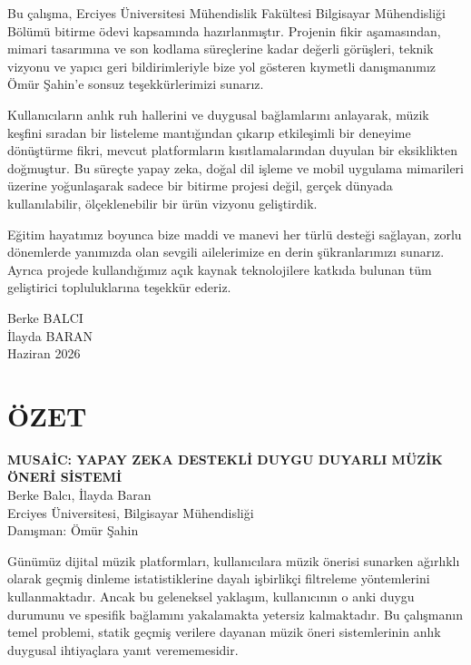 \documentclass[12pt, a4paper]{report}
\begin{document}
Bu çalışma, Erciyes Üniversitesi Mühendislik Fakültesi Bilgisayar Mühendisliği Bölümü bitirme ödevi kapsamında hazırlanmıştır. Projenin fikir aşamasından, mimari tasarımına ve son kodlama süreçlerine kadar değerli görüşleri, teknik vizyonu ve yapıcı geri bildirimleriyle bize yol gösteren kıymetli danışmanımız Ömür Şahin'e sonsuz teşekkürlerimizi sunarız.

Kullanıcıların anlık ruh hallerini ve duygusal bağlamlarını anlayarak, müzik keşfini sıradan bir listeleme mantığından çıkarıp etkileşimli bir deneyime dönüştürme fikri, mevcut platformların kısıtlamalarından duyulan bir eksiklikten doğmuştur. Bu süreçte yapay zeka, doğal dil işleme ve mobil uygulama mimarileri üzerine yoğunlaşarak sadece bir bitirme projesi değil, gerçek dünyada kullanılabilir, ölçeklenebilir bir ürün vizyonu geliştirdik.

Eğitim hayatımız boyunca bize maddi ve manevi her türlü desteği sağlayan, zorlu dönemlerde yanımızda olan sevgili ailelerimize en derin şükranlarımızı sunarız. Ayrıca projede kullandığımız açık kaynak teknolojilere katkıda bulunan tüm geliştirici topluluklarına teşekkür ederiz.

\vspace{1cm}
\begin{flushright}
Berke BALCI\\
İlayda BARAN\\
Haziran 2026
\end{flushright}

\newpage
{}
{}
\chapter*{ÖZET}

\begin{center}
  {\large\bfseries MUSAİC: YAPAY ZEKA DESTEKLİ DUYGU DUYARLI MÜZİK ÖNERİ SİSTEMİ}\\[0.5cm]
  Berke Balcı, İlayda Baran\\[0.3cm]
  Erciyes Üniversitesi, Bilgisayar Mühendisliği\\[0.3cm]
  Danışman: Ömür Şahin
\end{center}

\vspace{0.5cm}
Günümüz dijital müzik platformları, kullanıcılara müzik önerisi sunarken ağırlıklı olarak geçmiş dinleme istatistiklerine dayalı işbirlikçi filtreleme yöntemlerini kullanmaktadır. Ancak bu geleneksel yaklaşım, kullanıcının o anki duygu durumunu ve spesifik bağlamını yakalamakta yetersiz kalmaktadır. Bu çalışmanın temel problemi, statik geçmiş verilere dayanan müzik öneri sistemlerinin anlık duygusal ihtiyaçlara yanıt verememesidir.
\end{document}
